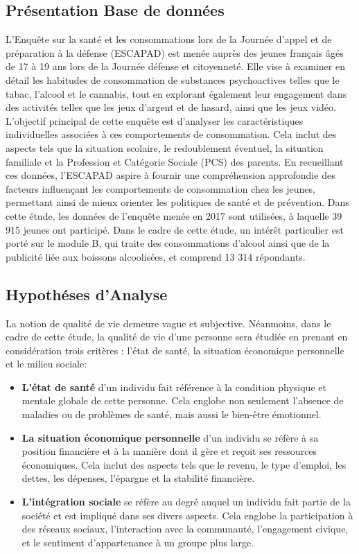 \documentclass{article}
\begin{document}
\subsection{Présentation Base de données}
L'Enquête sur la santé et les consommations lors de la Journée d'appel et de préparation à la défense (ESCAPAD) est menée auprès des jeunes français âgés de 17 à 19 ans lors de la Journée défense et citoyenneté. Elle vise à examiner en détail les habitudes de consommation de substances psychoactives telles que le tabac, l'alcool et le cannabis, tout en explorant également leur engagement dans des activités telles que les jeux d'argent et de hasard, ainsi que les jeux vidéo. 
L'objectif principal de cette enquête est d'analyser les caractéristiques individuelles associées à ces comportements de consommation. Cela inclut des aspects tels que la situation scolaire, le redoublement éventuel, la situation familiale et la Profession et Catégorie Sociale (PCS) des parents. En recueillant ces données, l'ESCAPAD aspire à fournir une compréhension approfondie des facteurs influençant les comportements de consommation chez les jeunes, permettant ainsi de mieux orienter les politiques de santé et de prévention.
Dans cette étude, les données de l'enquête menée en 2017 sont utilisées, à laquelle 39 915 jeunes ont participé. Dans le cadre de cette étude, un intérêt particulier est porté sur le module B, qui traite des consommations d’alcool ainsi que de la publicité liée aux boissons alcoolisées, et comprend 13 314 répondants.
\subsection{Hypothéses d'Analyse}

La notion de qualité de vie demeure vague et subjective.  Néanmoins, dans le cadre de cette étude, la qualité de vie d’une personne sera étudiée en prenant en considération trois critères : l’état de santé, la situation économique personnelle et le milieu sociale: 
\begin{itemize}
    \item \textbf{L'état de santé} d’un individu fait référence à la condition physique et mentale globale de cette personne. Cela englobe non seulement l’absence de maladies ou de problèmes de santé, mais aussi le bien-être émotionnel.
    \item \textbf{La situation économique personnelle} d'un individu se réfère à sa position financière et à la manière dont il gère et reçoit ses ressources économiques. Cela inclut des aspects tels que le revenu, le type d'emploi, les dettes, les dépenses, l'épargne et la stabilité financière.
    \item \textbf{L'intégration sociale} se réfère au degré auquel un individu fait partie de la société et est impliqué dans ses divers aspects. Cela englobe la participation à des réseaux sociaux, l'interaction avec la communauté, l'engagement civique, et le sentiment d'appartenance à un groupe plus large.
\end{itemize}
\vspace{0.5cm}
\end{document}
